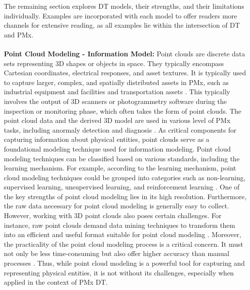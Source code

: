 \documentclass[runningheads]{llncs}
\begin{document}
The remaining section explores DT models, their strengths, and their limitations individually. Examples are incorporated with each model to offer readers more channels for extensive reading, as all examples lie within the intersection of DT and PMx.\\
\\
\indent \textbf{Point Cloud Modeling - Information Model:} Point clouds are discrete data sets representing 3D shapes or objects in space. They typically encompass Cartesian coordinates, electrical responses, and asset textures. It is typically used to capture larger, complex, and spatially distributed assets in PMx, such as industrial equipment and facilities \cite{stojanovic2018towards,sommer2019automatic} and transportation assets \cite{xue2020lidar}. This typically involves the output of 3D scanners \cite{zhang2022highly} or photogrammetry software \cite{mohammadi2021quality} during the inspection or monitoring phase, which often takes the form of point clouds. The point cloud data and the derived 3D model are used in various level of PMx tasks, including anormaly detection and diagnosis \cite{wu2023high,wang2022digital}. As critical components for capturing information about physical entities, point clouds serve as a foundational modeling technique used for information modeling. Point cloud modeling techniques can be classified based on various standards, including the learning mechanism. For example, according to the learning mechanism, point cloud modeling techniques could be grouped into categories such as non-learning, supervised learning, unsupervised learning, and reinforcement learning \cite{xue2020lidar}. One of the key strengths of point cloud modeling lies in its high resolution. Furthermore, the raw data necessary for point cloud modeling is generally easy to collect. However, working with 3D point clouds also poses certain challenges. For instance, raw point clouds demand data mining techniques to transform them into an efficient and useful format suitable for point cloud modeling \cite{macher2017point}. Moreover, the practicality of the point cloud modeling process is a critical concern. It must not only be less time-consuming but also offer higher accuracy than manual processes \cite{sommer2019automatic}. Thus, while point cloud modeling is a powerful tool for capturing and representing physical entities, it is not without its challenges, especially when applied in the context of PMx DT. \\
\end{document}
